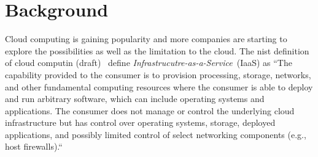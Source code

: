 \chapter{Background}

Cloud computing is gaining popularity and more companies are starting 
to explore the possibilities as well as the limitation to the cloud.
The nist definition of cloud computin (draft)~\cite{nist:mell11}
define \emph{Infrastrucutre-as-a-Service}~(IaaS) as
``The capability provided to the consumer is to provision 
processing, storage, networks, and other fundamental computing resources where the 
consumer is able to deploy and run arbitrary software, which can include operating 
systems and applications. The consumer does not manage or control the underlying cloud 
infrastructure but has control over operating systems, storage, deployed applications, and 
possibly limited control of select networking components (e.g., host firewalls).``



